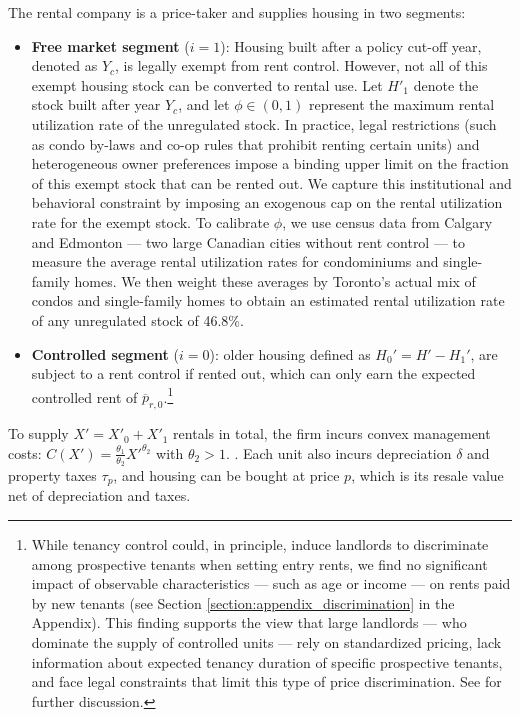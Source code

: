 \documentclass[parskip=full]{article}
\begin{document}
The rental company is a price-taker and supplies housing in two segments:
\begin{itemize}
    \item \textbf{Free market segment} ($i=1$): Housing built after a policy cut-off year, denoted as $Y_{c}$, is legally exempt from rent control. However, not all of this exempt housing stock can be converted to rental use. Let $H'_1$ denote the stock built after year $Y_{c}$, and let $\phi \in (0,1)$ represent the maximum rental utilization rate of the unregulated stock. In practice, legal restrictions (such as condo by-laws and co-op rules that prohibit renting certain units) and heterogeneous owner preferences impose a binding upper limit on the fraction of this exempt stock that can be rented out. We capture this institutional and behavioral constraint by imposing an exogenous cap on the rental utilization rate for the exempt stock. To calibrate $\phi$, we use census data from Calgary and Edmonton — two large Canadian cities without rent control — to measure the average rental utilization rates for condominiums and single-family homes. We then weight these averages by Toronto’s actual mix of condos and single-family homes to obtain an estimated rental utilization rate of any unregulated stock of 46.8\%.
    \item \textbf{Controlled segment} ($i=0$): older housing defined as $H_0'=H'-H_1'$, are subject to a rent control if rented out, which can only earn the expected controlled rent of $\overline{p}_{r,0}$.\footnote{While tenancy control could, in principle, induce landlords to discriminate among prospective tenants when setting entry rents, we find no significant impact of observable characteristics — such as age or income — on rents paid by new tenants (see Section \ref{section:appendix_discrimination} in the Appendix). This finding supports the view that large landlords — who dominate the supply of controlled units — rely on standardized pricing, lack information about expected tenancy duration of specific prospective tenants, and face legal constraints that limit this type of price discrimination. See \citet{be-2000} for further discussion.}
\end{itemize}

To supply $X'=X'_0+X'_1$ rentals in total, the firm incurs convex management costs: $C(X')=\frac{\theta_1}{\theta_2}X'^{\theta_2}$ with $\theta_2>1.$ \citep{garrigaeetal-2009}. Each unit also incurs depreciation $\delta$ and property taxes $\tau_p$, and housing can be bought at price $p$, which is its resale value net of depreciation and taxes.
\end{document}

